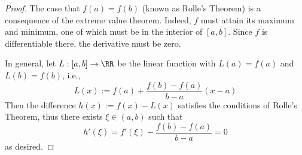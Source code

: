 

\begin{proof}
The case that $f(a)=f(b)$ (known as Rolle's Theorem) 
is a consequence of the extreme value theorem. Indeed, $f$ must attain 
its maximum and minimum, one of which must be in the interior of $[a,b]$. 
Since $f$ is differentiable there, the derivative must be zero.

In general, let $L:[a,b]\to\RR$ be the linear function 
with $L(a)=f(a)$ and $L(b)=f(b)$, i.e.,
$$
L(x):=f(a) + \frac{f(b)-f(a)}{b-a}(x-a)
$$
Then the difference $h(x):=f(x)-L(x)$ satisfies the conditions 
of Rolle's Theorem, thus there exists $\xi\in (a,b)$ such 
that 
$$
h'(\xi) = f'(\xi)-\frac{f(b)-f(a)}{b-a} = 0
$$
as desired.
\end{proof}

